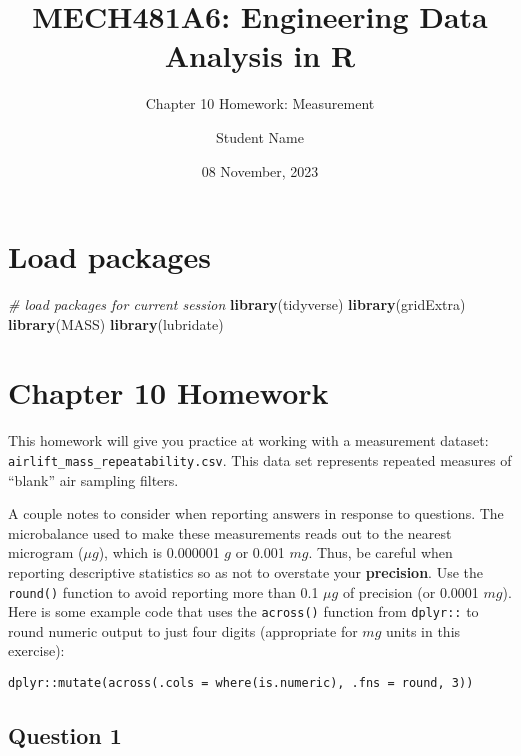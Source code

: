 \documentclass[
]{article}
\title{MECH481A6: Engineering Data Analysis in R}
\subtitle{Chapter 10 Homework: Measurement}
\author{Student Name}
\date{08 November, 2023}
\newenvironment{Shaded}{\begin{snugshade}}{\end{snugshade}}
\newcommand{\CommentTok}[1]{\textcolor[rgb]{0.56,0.35,0.01}{\textit{#1}}}
\newcommand{\FunctionTok}[1]{\textcolor[rgb]{0.13,0.29,0.53}{\textbf{#1}}}
\newcommand{\NormalTok}[1]{#1}
\begin{document}
\maketitle

\hypertarget{load-packages}{%
\section{Load packages}\label{load-packages}}

\begin{Shaded}
\begin{Highlighting}[]
\CommentTok{\# load packages for current session}
\FunctionTok{library}\NormalTok{(tidyverse) }
\FunctionTok{library}\NormalTok{(gridExtra) }
\FunctionTok{library}\NormalTok{(MASS)}
\FunctionTok{library}\NormalTok{(lubridate)}
\end{Highlighting}
\end{Shaded}

\hypertarget{chapter-10-homework}{%
\section{Chapter 10 Homework}\label{chapter-10-homework}}

This homework will give you practice at working with a measurement
dataset: \texttt{airlift\_mass\_repeatability.csv}. This data set
represents repeated measures of ``blank'' air sampling filters.

A couple notes to consider when reporting answers in response to
questions. The microbalance used to make these measurements reads out to
the nearest microgram (\(\mu g\)), which is 0.000001 \(g\) or 0.001
\(mg\). Thus, be careful when reporting descriptive statistics so as not
to overstate your \textbf{precision}. Use the \texttt{round()} function
to avoid reporting more than 0.1 \(\mu g\) of precision (or 0.0001
\(mg\)). Here is some example code that uses the \texttt{across()}
function from \texttt{dplyr::} to round numeric output to just four
digits (appropriate for \(mg\) units in this exercise):

\texttt{dplyr::mutate(across(.cols\ =\ where(is.numeric),\ .fns\ =\ round,\ 3))}

\newpage

\hypertarget{question-1}{%
\subsection{Question 1}\label{question-1}}
\end{document}
